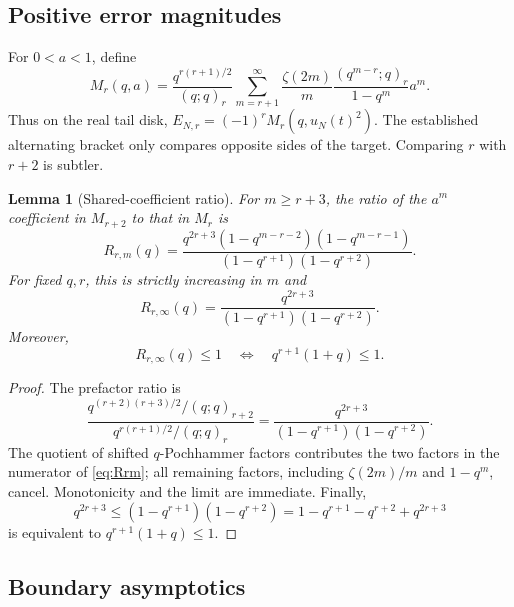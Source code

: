 \documentclass[11pt,oneside]{article}
\numberwithin{equation}{section}
\theoremstyle{frontier}
\newtheorem{lemma}[theorem]{Lemma}
\theoremstyle{definition}
\theoremstyle{remark}
\begin{document}
\subsection{Positive error magnitudes}

For $0<a<1$, define
\begin{equation}
 M_r(q,a)=\frac{q^{r(r+1)/2}}{(q;q)_r}
 \sum_{m=r+1}^{\infty}\frac{\zeta(2m)}{m}
 \frac{(q^{m-r};q)_r}{1-q^m}a^m.
 \label{eq:Mr}
\end{equation}
Thus on the real tail disk, $E_{N,r}=(-1)^rM_r(q,u_N(t)^2)$.  The established alternating
bracket only compares opposite sides of the target.  Comparing $r$ with $r+2$ is subtler.

\begin{lemma}[Shared-coefficient ratio]\label{lem:coefficient-ratio}
For $m\ge r+3$, the ratio of the $a^m$ coefficient in $M_{r+2}$ to that in $M_r$ is
\begin{equation}
 R_{r,m}(q)=
 \frac{q^{2r+3}(1-q^{m-r-2})(1-q^{m-r-1})}
 {(1-q^{r+1})(1-q^{r+2})}.
 \label{eq:Rrm}
\end{equation}
For fixed $q,r$, this is strictly increasing in $m$ and
\begin{equation}
 R_{r,\infty}(q)=
 \frac{q^{2r+3}}{(1-q^{r+1})(1-q^{r+2})}.
 \label{eq:Rinfty}
\end{equation}
Moreover,
\begin{equation}
 R_{r,\infty}(q)\le1
 \quad\Longleftrightarrow\quad q^{r+1}(1+q)\le1.
 \label{eq:threshold-equivalence}
\end{equation}
\end{lemma}

\begin{proof}
The prefactor ratio is
\[
 \frac{q^{(r+2)(r+3)/2}/(q;q)_{r+2}}
      {q^{r(r+1)/2}/(q;q)_r}
 =\frac{q^{2r+3}}{(1-q^{r+1})(1-q^{r+2})}.
\]
The quotient of shifted $q$-Pochhammer factors contributes the two factors in the numerator
of \eqref{eq:Rrm}; all remaining factors, including $\zeta(2m)/m$ and $1-q^m$, cancel.
Monotonicity and the limit are immediate.  Finally,
\[
 q^{2r+3}\le(1-q^{r+1})(1-q^{r+2})
 =1-q^{r+1}-q^{r+2}+q^{2r+3}
\]
is equivalent to $q^{r+1}(1+q)\le1$.
\end{proof}

\subsection{Boundary asymptotics}
\end{document}
